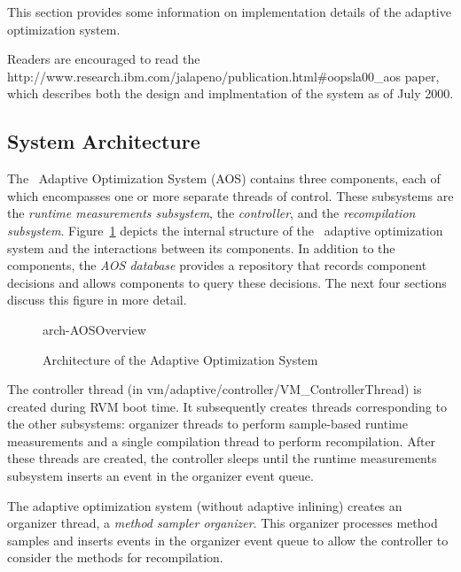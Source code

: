 This section provides some information on 
implementation details of the adaptive optimization system.

Readers are encouraged to read the 
{http://www.research.ibm.com/jalapeno/publication.html\#oopsla00\_aos}  
paper, which describes both the design and implmentation of the system
as of July 2000.


\subsection{System Architecture}
The \jp\ Adaptive Optimization System (AOS) contains three components, 
each of which encompasses one or more separate threads of control. 
These subsystems are 
the {\em runtime measurements subsystem\/}, 
the {\em controller\/},  
and the {\em recompilation subsystem\/}.  
Figure~\ref{fig:arch-AOSOverview} depicts the internal structure of
the \jp\ adaptive optimization system and the interactions between its
components. 
In addition to the components, the {\em AOS database} provides a 
repository that records component decisions and allows components 
to query these decisions.
The next four sections discuss this figure in more detail.

\begin{figure}
\begin{center}
\begin{gif}{arch-AOSOverview}
\vbox{
\hbox{
}
}\hfil
\end{gif}
\end{center}
\caption{Architecture of the Adaptive Optimization System}
\label{fig:arch-AOSOverview}
\end{figure}

The controller thread (in vm/adaptive/controller/VM\_ControllerThread)
is created during RVM boot time.  It subsequently creates threads
corresponding to the other subsystems: organizer threads to perform
sample-based runtime measurements and a single compilation thread to
perform recompilation. After these threads are created, the controller
sleeps until the runtime measurements subsystem inserts an event in
the organizer event queue.

The adaptive optimization system (without adaptive inlining) creates
an organizer thread, a {\em method sampler organizer\/}.  This
organizer processes method samples and inserts events in the organizer
event queue to allow the controller to consider the methods for
recompilation.

